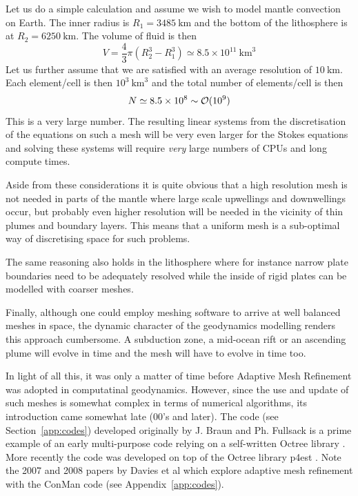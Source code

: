 Let us do a simple calculation and assume we wish to model mantle convection on Earth. 
The inner radius is $R_1=3485~\si{\km}$ and the bottom of the lithosphere is at $R_2=6250~\si{\km}$. 
The volume of fluid is then 
\[
V = \frac{4}{3}\pi (R_2^3-R_1^3) \simeq 8.5\times 10^{11}~\si{\km}^3
\]
Let us further assume that we are satisfied with an average resolution of $10~\si{\km}$. 
Each element/cell is then $10^3~\si{\km}^3$ and the total number of elements/cell is then 
\[
N \simeq 8.5 \times 10^8 \sim {\cal O}(10^9)
\]
This is a very large number. The resulting linear systems from the discretisation of the 
equations on such a mesh will be very even larger for the Stokes equations and solving 
these systems will require {\it very} large numbers of CPUs and long compute times. 

Aside from these considerations it is quite obvious that a high resolution mesh is not needed 
in parts of the mantle where large scale upwellings and downwellings occur, but 
probably even higher resolution will be needed in the vicinity of thin plumes and boundary layers. 
This means that a uniform mesh is a sub-optimal way of discretising space for such problems. 

The same reasoning also holds in the lithosphere where for instance narrow plate boundaries need to 
be adequately resolved while the inside of rigid plates can be modelled with coarser meshes. 

Finally, although one could employ meshing software to arrive at well balanced meshes in space, the 
dynamic character of the geodynamics modelling renders this approach cumbersome. A subduction zone, 
a mid-ocean rift or an ascending plume will evolve in time and the mesh will have to evolve in time too. 

In light of all this, it was only a matter of time before Adaptive Mesh Refinement was adopted 
in computatinal geodynamics. However, since the use and update of such meshes is somewhat 
complex in terms of numerical algorithms, its introduction came somewhat late (00's and later).
The \douar code (see Section~\ref{app:codes}) developed originally by J. Braun and Ph. Fullsack 
is a prime example of an early multi-purpose code relying on a self-written Octree library \cite{brtf08}.
More recently the \aspect{} code was developed on top of the Octree library p4est \cite{buwg11}.
Note the 2007 and 2008 papers by Davies et al \cite{dadh07,dadh08} which explore adaptive mesh 
refinement with the ConMan code (see Appendix~\ref{app:codes}).

